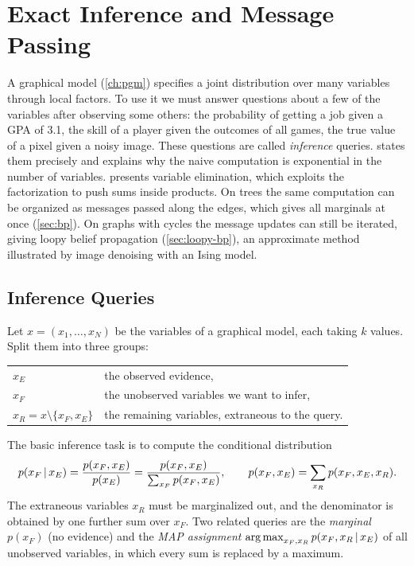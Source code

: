 \chapter{Exact Inference and Message Passing}\label{ch:inference}

A graphical model (\cref{ch:pgm}) specifies a joint distribution over many variables through local factors. To use it we must answer questions about a few of the variables after observing some others: the probability of getting a job given a GPA of 3.1, the skill of a player given the outcomes of all games, the true value of a pixel given a noisy image. These questions are called \emph{inference} queries.  states them precisely and explains why the naive computation is exponential in the number of variables.  presents variable elimination, which exploits the factorization to push sums inside products. On trees the same computation can be organized as messages passed along the edges, which gives all marginals at once (\cref{sec:bp}). On graphs with cycles the message updates can still be iterated, giving loopy belief propagation (\cref{sec:loopy-bp}), an approximate method illustrated by image denoising with an Ising model.

\section{Inference Queries}\label{sec:inference-queries}

Let $x=(x_1,\dots,x_N)$ be the variables of a graphical model, each taking $k$ values. Split them into three groups:
\begin{center}
\begin{tabular}{@{}ll@{}}
$x_E$ & the observed evidence, \\
$x_F$ & the unobserved variables we want to infer, \\
$x_R=x\setminus\{x_F,x_E\}$ & the remaining variables, extraneous to the query.
\end{tabular}
\end{center}
The basic inference task is to compute the conditional distribution
\begin{equation}\label{eq:inference-query}
p(x_F\,|\, x_E)=\frac{p(x_F,x_E)}{p(x_E)}=\frac{p(x_F,x_E)}{\sum_{x_F}p(x_F,x_E)},\qquad p(x_F,x_E)=\sum_{x_R}p(x_F,x_E,x_R).
\end{equation}
The extraneous variables $x_R$ must be marginalized out, and the denominator is obtained by one further sum over $x_F$. Two related queries are the \emph{marginal} $p(x_F)$ (no evidence) and the \emph{MAP assignment} $\operatorname*{arg\,max}_{x_F,x_R}p(x_F,x_R\,|\, x_E)$ of all unobserved variables, in which every sum is replaced by a maximum.

